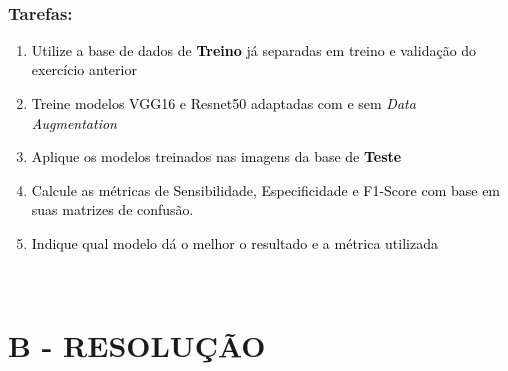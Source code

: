 \textcolor{black}{ }

\subsubsection*{Tarefas:}

\begin{enumerate}[series=listWWNumxxv,label=\alph*),ref=\alph*]
\item \textcolor{black}{Utilize a base de dados de }\textbf{\textcolor{black}{Treino}}\textcolor{black}{ já separadas em
treino e validação do exercício anterior}\textcolor{black}{ }
\item \textcolor{black}{Treine modelos VGG16 e Resnet50 adaptadas com e sem }\textit{\textcolor{black}{Data
Augmentation}}\textcolor{black}{ }
\item \textcolor{black}{Aplique os modelos treinados nas imagens da base de
}\textbf{\textcolor{black}{Teste}}\textcolor{black}{ }
\item \textcolor{black}{Calcule as métricas de Sensibilidade, Especificidade e F1-Score com base em suas matrizes de
confusão.}\textcolor{black}{ }
\item \textcolor{black}{Indique qual modelo dá o melhor o resultado e a métrica utilizada}\textcolor{black}{ }
\end{enumerate}
\textcolor{black}{ }

\section*{\textbf{B - RESOLUÇÃO}}
\lipsum[30]